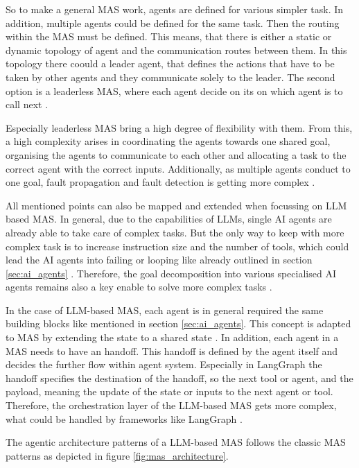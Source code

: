 \documentclass[a4paper,oneside,bibliography=totoc]{scrbook}
\begin{document}
So to make a general \ac{MAS} work, agents are defined for various simpler task. In addition, multiple agents could be defined for the same task. Then the routing within the \ac{MAS} must be defined. This means, that there is either a static or dynamic topology of agent and the communication routes between them. In this topology there coould a leader agent, that defines the actions that have to be taken by other agents and they communicate solely to the leader. The second option is a leaderless \ac{MAS}, where each agent decide on its on which agent is to call next \cite{Dorri2018}.

Especially leaderless \ac{MAS} bring a high degree of flexibility with them. From this, a high complexity arises in coordinating the agents towards one shared goal, organising the agents to communicate to each other and allocating a task to the correct agent with the correct inputs. Additionally, as multiple agents conduct to one goal, fault propagation and fault detection is getting more complex \cite{Dorri2018}.

All mentioned points can also be mapped and extended when focussing on \ac{LLM} based \ac{MAS}. In general, due to the capabilities of \acp{LLM}, single \ac{AI} agents are already able to take care of complex tasks. But the only way to keep with more complex task is to increase instruction size and the number of tools, which could lead the \ac{AI} agents into failing or looping like already outlined in section \ref{sec:ai_agents} \cite{OpenAI2025}. Therefore, the goal decomposition into various specialised \ac{AI} agents remains also a key enable to solve more complex tasks \cite{Sapkota2025}.

In the case of \ac{LLM}-based \ac{MAS}, each agent is in general required the same building blocks like mentioned in section \ref{sec:ai_agents}. This concept is adapted to \ac{MAS} by extending the state to a shared state \cite{Sapkota2025}. In addition, each agent in a \ac{MAS} needs to have an handoff. This handoff is defined by the agent itself and decides the further flow within agent system. Especially in LangGraph the handoff specifies the destination of the handoff, so the next tool or agent, and the payload, meaning the update of the state or inputs to the next agent or tool. Therefore, the orchestration layer of the \ac{LLM}-based \ac{MAS} gets more complex, what could be handled by frameworks like LangGraph \cite{LangChain2025b}.

The agentic architecture patterns of a \ac{LLM}-based \ac{MAS} follows the classic \ac{MAS} patterns as depicted in figure \ref{fig:mas_architecture}.
\end{document}
